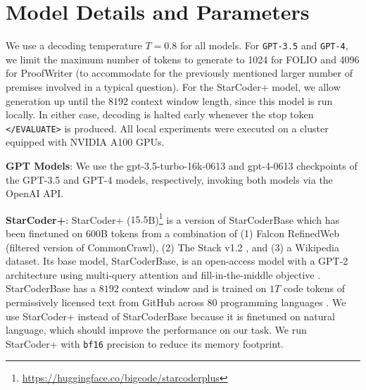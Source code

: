 \section{Model Details and Parameters} \label{sec:appendix_model_details}
We use a decoding temperature $T=0.8$ for all models. 
For \texttt{GPT-3.5} and \texttt{GPT-4}, we limit the maximum number of tokens to generate to 1024 for FOLIO and 4096 for ProofWriter (to accommodate for the previously mentioned larger number of premises involved in a typical question).
For the StarCoder+ model, we allow generation up until the $8192$ context window length, since this model is run locally. In either case, decoding is halted early whenever the stop token \texttt{</EVALUATE>} is produced. All local experiments were executed on a cluster equipped with NVIDIA A100 GPUs.

\textbf{GPT Models}: We use the gpt-3.5-turbo-16k-0613 and gpt-4-0613 checkpoints of the GPT-3.5 \citep{ouyang2022training} and GPT-4 \citep{openai2023gpt4} models, respectively, invoking both models via the OpenAI API. 

\textbf{StarCoder+}: StarCoder+ ($15.5$B)\footnote{\url{https://huggingface.co/bigcode/starcoderplus}} is a version of StarCoderBase \citep{li2023starcoder} which has been finetuned on 600B tokens from a combination of (1) Falcon RefinedWeb \citep{refinedweb} (filtered version of CommonCrawl), (2) The Stack v1.2 \citep{kocetkov2022stack}, and (3) a Wikipedia dataset. Its base model, StarCoderBase, is an open-access model with a GPT-2 architecture using multi-query attention \citep{shazeer2019fast} and fill-in-the-middle objective \citep{bavarian2022efficient}. StarCoderBase has a $8192$ context window and is trained on $1T$ code tokens of permissively licensed text from GitHub across $80$ programming languages \citep{li2023starcoder}. We use StarCoder+ instead of StarCoderBase because it is finetuned on natural language, which should improve the performance on our task. We run StarCoder+ with \texttt{bf16} precision to reduce its memory footprint.